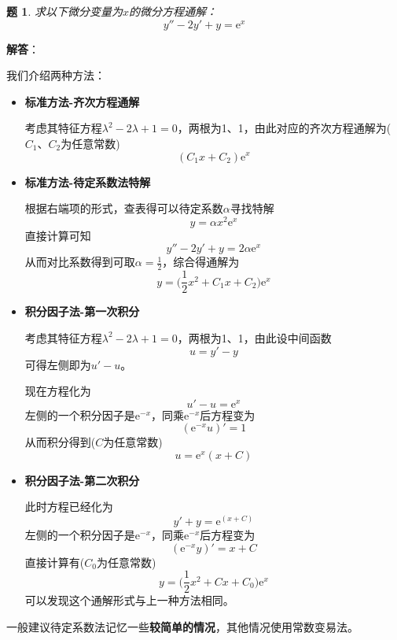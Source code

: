 \documentclass[a4paper,UTF8,fontset=windows,AutoFakeBold]{ctexart}
\newcommand*{\er}{\mathrm{e}}
\newcommand*{\note}{\noindent *}
\theoremstyle{ex}
\newtheorem{exercise}{题}
\newcommand{\sol}[1]{{\vspace{5pt}\kaishu\noindent\textbf{解答}：\vspace{-3pt}
\begin{compactitem}
    \item[] #1
\end{compactitem}
}}
\begin{document}
\begin{framed}
\begin{exercise}
    求以下微分变量为$x$的微分方程通解：
    $$y''-2y'+y=\er^x$$
\end{exercise}
\sol{
    我们介绍两种方法：
    \begin{itemize}
        \item \textbf{标准方法-齐次方程通解}
        
        考虑其特征方程$\lambda^2-2\lambda+1=0$，两根为1、1，由此对应的齐次方程通解为($C_1$、$C_2$为任意常数)
        $$(C_1x+C_2)\er^x$$
        
        \item \textbf{标准方法-待定系数法特解}
        
        根据右端项的形式，查表得可以待定系数$\alpha$寻找特解
        $$y=\alpha x^2\er^x$$
        直接计算可知
        $$y''-2y'+y=2\alpha\er^x$$
        从而对比系数得到可取$\alpha=\frac{1}{2}$，综合得通解为
        $$y=\bigg(\frac{1}{2}x^2+C_1x+C_2\bigg)\er^x$$

        \item \textbf{积分因子法-第一次积分}

        考虑其特征方程$\lambda^2-2\lambda+1=0$，两根为1、1，由此设中间函数
        $$u=y'-y$$
        可得左侧即为$u'-u$。

        现在方程化为
        $$u'-u=\er^x$$
        左侧的一个积分因子是$\er^{-x}$，同乘$\er^{-x}$后方程变为
        $$(\er^{-x}u)'=1$$
        从而积分得到($C$为任意常数)
        $$u=\er^x(x+C)$$

        \item \textbf{积分因子法-第二次积分}
        
        此时方程已经化为
        $$y'+y=\er^(x+C)$$
        左侧的一个积分因子是$\er^{-x}$，同乘$\er^{-x}$后方程变为
        $$(\er^{-x}y)'=x+C$$
        直接计算有($C_0$为任意常数)
        $$y=\bigg(\frac{1}{2}x^2+Cx+C_0\bigg)\er^x$$
        可以发现这个通解形式与上一种方法相同。
    \end{itemize}
}
\end{framed}

\note 一般建议待定系数法记忆一些\textbf{较简单的情况}，其他情况使用常数变易法。
\end{document}

